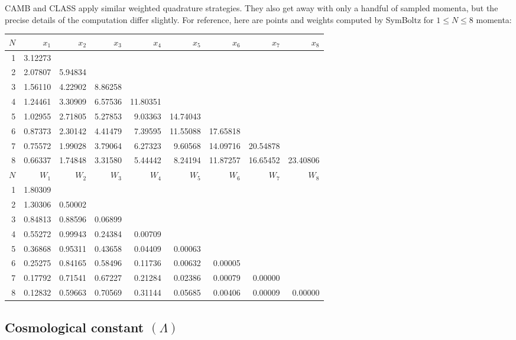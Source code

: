 \documentclass{aa}
\begin{document}
CAMB \citep{lewisCAMBNotes2025} and CLASS \citep{lesgourguesCosmicLinearAnisotropy2011a} apply similar weighted quadrature strategies.
They also get away with only a handful of sampled momenta, but the precise details of the computation differ slightly.
For reference, here are points and weights computed by SymBoltz for $1 \leq N \leq 8$ momenta:
\begin{center}
\begin{tabular}{  r r r r r r r r r  } 
\toprule
$N$ & $x_1$ & $x_2$ & $x_3$ & $x_4$ & $x_5$ & $x_6$ & $x_7$ & $x_8$ \\
\midrule
1 & 3.12273 & & & & & & & \\
2 & 2.07807 & 5.94834 & & & & & & \\
3 & 1.56110 & 4.22902 & 8.86258 & & & & & \\
4 & 1.24461 & 3.30909 & 6.57536 & 11.80351 & & & & \\
5 & 1.02955 & 2.71805 & 5.27853 & 9.03363 & 14.74043 & & & \\
6 & 0.87373 & 2.30142 & 4.41479 & 7.39595 & 11.55088 & 17.65818 & & \\
7 & 0.75572 & 1.99028 & 3.79064 & 6.27323 & 9.60568 & 14.09716 & 20.54878 & \\
8 & 0.66337 & 1.74848 & 3.31580 & 5.44442 & 8.24194 & 11.87257 & 16.65452 & 23.40806 \\
\midrule
$N$ & $W_1$ & $W_2$ & $W_3$ & $W_4$ & $W_5$ & $W_6$ & $W_7$ & $W_8$ \\
\midrule
1 & 1.80309 & & & & & & & \\
2 & 1.30306 & 0.50002 & & & & & & \\
3 & 0.84813 & 0.88596 & 0.06899 & & & & & \\
4 & 0.55272 & 0.99943 & 0.24384 & 0.00709 & & & & \\
5 & 0.36868 & 0.95311 & 0.43658 & 0.04409 & 0.00063 & & & \\
6 & 0.25275 & 0.84165 & 0.58496 & 0.11736 & 0.00632 & 0.00005 & & \\
7 & 0.17792 & 0.71541 & 0.67227 & 0.21284 & 0.02386 & 0.00079 & 0.00000 & \\
8 & 0.12832 & 0.59663 & 0.70569 & 0.31144 & 0.05685 & 0.00406 & 0.00009 & 0.00000 \\
\bottomrule
\end{tabular}
\end{center}


\subsection{Cosmological constant \texorpdfstring{$(\Lambda)$}{(Λ)}}
\label{sec:cc}
\end{document}
